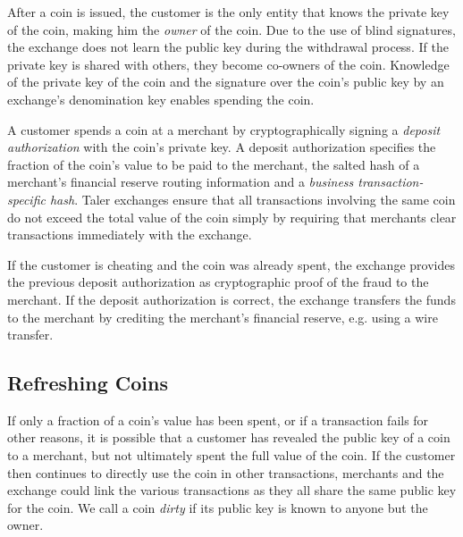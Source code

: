 \documentclass[sigconf, authordraft]{acmart}
\begin{document}

After a coin is issued, the customer is the only entity that knows the
private key of the coin, making him the \emph{owner} of the coin.  Due
to the use of blind signatures, the exchange does not learn the
public key during the withdrawal process.  If the private key is
shared with others, they become co-owners of the coin.  Knowledge of
the private key of the coin and the signature over the coin's public
key by an exchange's denomination key enables spending the
coin.



A customer spends a coin at a merchant by cryptographically signing a
{\em deposit authorization} with the coin's private key.  A deposit
authorization specifies the fraction of the coin's value to be paid to
the merchant, the salted hash of a merchant's financial reserve
routing information and a {\em business transaction-specific hash}.
Taler exchanges ensure that all transactions involving the same coin
do not exceed the total value of the coin simply by requiring that
merchants clear transactions immediately with the exchange.

If the customer is cheating and the coin was already spent, the
exchange provides the previous deposit authorization as cryptographic
proof of the fraud to the merchant.  If the deposit authorization is
correct, the exchange transfers the funds to the merchant by crediting
the merchant's financial reserve, e.g. using a wire transfer.


\subsection{Refreshing Coins}

If only a fraction of a coin's value has been spent, or if a
transaction fails for other reasons, it is possible that a customer
has revealed the public key of a coin to a merchant, but not
ultimately spent the full value of the coin.  If the customer then
continues to directly use the coin in other transactions, merchants
and the exchange could link the various transactions as they all share
the same public key for the coin.  We call a coin {\em dirty} if its
public key is known to anyone but the owner.
\end{document}
